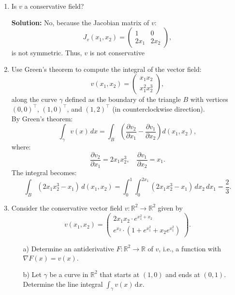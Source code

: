 \documentclass{article}
\begin{document}
\begin{enumerate}
    \item Is \( v \) a conservative field?
    
    \textbf{Solution:}
    No, because the Jacobian matrix of \( v \):
    \[
    J_v(x_1, x_2) = \begin{pmatrix} 1 & 0 \\ 2x_1 & 2x_2 \end{pmatrix},
    \]
    is not symmetric. Thus, \( v \) is not conservative
    
\item 
\vspace{5mm}
Use Green's theorem to compute the integral of the vector field:
\[
v(x_1, x_2) = \begin{pmatrix} x_1 x_2 \\ x_1^2 x_2^3 \end{pmatrix},
\]
along the curve \(\gamma\) defined as the boundary of the triangle \( B \) with vertices \((0,0)^\top\), \((1,0)^\top\), and \((1,2)^\top\) (in counterclockwise direction).
\\
By Green's theorem:
\[
\int_{\gamma} v(x) \, dx = \int_{B} \left( \frac{\partial v_2}{\partial x_1} - \frac{\partial v_1}{\partial x_2} \right) d(x_1, x_2),
\]
where:
\[
\frac{\partial v_2}{\partial x_1} = 2x_1 x_2^3, \quad \frac{\partial v_1}{\partial x_2} = x_1.
\]
The integral becomes:
\[
\int_{B} (2x_1 x_2^3 - x_1) \, d(x_1, x_2) = \int_{0}^{1} \int_{0}^{2x_1} (2x_1 x_2^3 - x_1) \, dx_2 \, dx_1 = \frac{2}{3}.
\]

\item Consider the conservative vector field \( v: \mathbb{R}^{2} \to \mathbb{R}^{2} \) given by 
\[ v(x_{1}, x_{2}) = \begin{pmatrix} 2x_{1}x_{2} \cdot e^{x_{1}^{2} + x_{2}} \\ e^{x_{2}} \cdot \left(1 + e^{x_{1}^{2}} + x_{2} e^{x_{1}^{2}}\right) \end{pmatrix}. \]

\begin{enumerate}
    \item[a)] Determine an antiderivative \( F: \mathbb{R}^{2} \to \mathbb{R} \) of \( v \), i.e., a function with \( \nabla F(x) = v(x) \).

    \item[b)] Let \( \gamma \) be a curve in \( \mathbb{R}^{2} \) that starts at \( (1, 0) \) and ends at \( (0, 1) \). Determine the line integral \( \int_{\gamma} v(x) \, \mathrm{d}x \).
\end{enumerate}


\end{enumerate}
\end{document}
